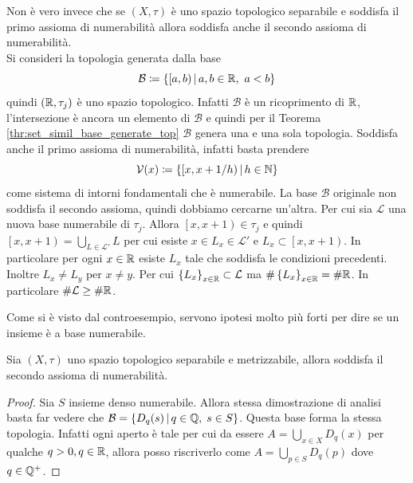 \begin{remark}
	Non è vero invece che se $(X,\tau)$ è uno spazio topologico separabile e soddisfa il primo assioma di numerabilità allora soddisfa anche il secondo assioma di numerabilità. \\
	Si consideri la topologia generata dalla base
	\begin{equation*}
		\mathcal{B} \coloneqq \left\{ \left[a,b\right) \,\middle|\, a,b \in \mathbb{R},\ a < b \right\}
	\end{equation*}  
	quindi $(\mathbb{R}, \tau_j)$ è uno spazio topologico. Infatti $\mathcal{B}$ è un ricoprimento di $\mathbb{R}$, l'intersezione è ancora un elemento di $\mathcal{B}$ e quindi per il Teorema \ref{thr:set_simil_base_generate_top} $\mathcal{B}$ genera una e una sola topologia. Soddisfa anche il primo assioma di numerabilità, infatti basta prendere 
	\begin{equation*}
		\mathcal{V}(x) \coloneqq \left\{\left[x, x+1/h\right) \,\middle|\, h \in \mathbb{N} \right\}
	\end{equation*}
	come sistema di intorni fondamentali che è numerabile. La base $\mathcal{B}$ originale non soddisfa il secondo assioma, quindi dobbiamo cercarne un'altra. Per cui sia $\mathcal{L}$ una nuova base numerabile di $\tau_j$. Allora $\left[x, x+1\right) \in \tau_j$ e quindi $\left[x, x+1\right) = \bigcup_{L \in \mathcal{L}'} L$ per cui esiste $x \in L_x \in \mathcal{L}'$ e $L_x \subset \left[x,x+1\right)$. In particolare per ogni $x \in \mathbb{R}$ esiste $L_x$ tale che soddisfa le condizioni precedenti. Inoltre $L_x \neq L_y$ per $x \neq y$. Per cui $ \left\{L_x\right\}_{x\in \mathbb{R}} \subset \mathcal{L}$ ma $\# \left\{L_x\right\}_{x\in \mathbb{R}} = \# \mathbb{R}$. In particolare $\# \mathcal{L} \ge \#\mathbb{R}$.
\end{remark}

Come si è visto dal controesempio, servono ipotesi molto più forti per dire se un insieme è a base numerabile.

\begin{theorem}
	Sia $(X, \tau)$ uno spazio topologico separabile e metrizzabile, allora soddisfa il secondo assioma di numerabilità.
\end{theorem}
\begin{proof}
	Sia $S$ insieme denso numerabile. Allora stessa dimostrazione di analisi basta far vedere che $\mathcal{B} = \left\{ D_q(s) \,\middle|\, q \in \mathbb{Q}, \; s \in S\right\}$. Questa base forma la stessa topologia. Infatti ogni aperto è tale per cui da essere $A = \bigcup_{x \in X} D_q(x)$ per qualche $q > 0, q\in \mathbb{R}$, allora posso riscriverlo come $A = \bigcup_{p \in S} D_q(p)$ dove $q \in \mathbb{Q}^+$.
\end{proof}


